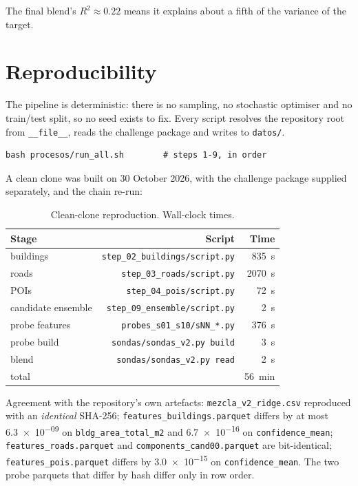 \documentclass[a4paper]{article}
\begin{document}
The final blend's $R^2\approx0.22$ means it explains about a fifth of the variance of the target.

\section{Reproducibility}
\label{sec:repro}

The pipeline is deterministic: there is no sampling, no stochastic optimiser and no train/test
split, so no seed exists to fix. Every script resolves the repository root from
\texttt{\_\_file\_\_}, reads the challenge package and writes to \texttt{datos/}.

\begin{verbatim}
bash procesos/run_all.sh        # steps 1-9, in order
\end{verbatim}

A clean clone was built on 30 October 2026, with the challenge package supplied separately, and the
chain re-run:

\begin{table}[htbp]
\centering
\small
\caption{Clean-clone reproduction. Wall-clock times.}
\begin{tabular}{lrr}
\toprule
Stage & Script & Time \\
\midrule
buildings & \texttt{step\_02\_buildings/script.py} & \SI{835}{s} \\
roads & \texttt{step\_03\_roads/script.py} & \SI{2070}{s} \\
POIs & \texttt{step\_04\_pois/script.py} & \SI{72}{s} \\
candidate ensemble & \texttt{step\_09\_ensemble/script.py} & \SI{2}{s} \\
probe features & \texttt{probes\_s01\_s10/sNN\_*.py} & \SI{376}{s} \\
probe build & \texttt{sondas/sondas\_v2.py build} & \SI{3}{s} \\
blend & \texttt{sondas/sondas\_v2.py read} & \SI{2}{s} \\
\midrule
total & & \SI{56}{min} \\
\bottomrule
\end{tabular}
\end{table}

Agreement with the repository's own artefacts: \texttt{mezcla\_v2\_ridge.csv} reproduced with
an \emph{identical} SHA-256; \texttt{features\_buildings.parquet} differs by at most
\num{6.3e-09} on \texttt{bldg\_area\_total\_m2} and \num{6.7e-16} on \texttt{confidence\_mean};
\texttt{features\_roads.parquet} and \texttt{components\_cand00.parquet} are bit-identical;
\texttt{features\_pois.parquet} differs by \num{3.0e-15} on \texttt{confidence\_mean}. The two
probe parquets that differ by hash differ only in row order.
\end{document}
